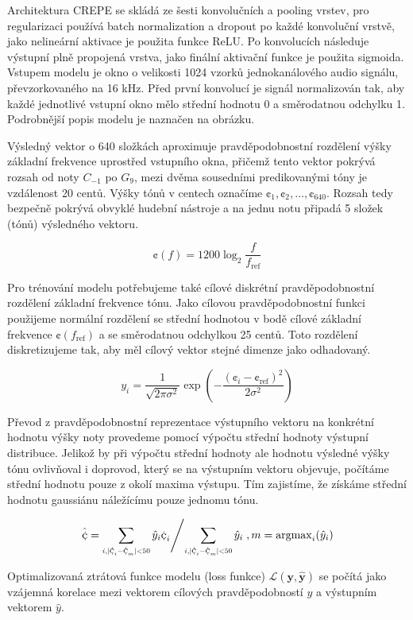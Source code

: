 Architektura CREPE se skládá ze šesti konvolučních a pooling vrstev, pro regularizaci používá batch normalization a dropout po každé konvoluční vrstvě, jako nelineární aktivace je použita funkce ReLU. Po konvolucích následuje výstupní plně propojená vrstva, jako finální aktivační funkce je použita sigmoida. Vstupem modelu je okno o velikosti 1024 vzorků jednokanálového audio signálu, převzorkovaného na 16 kHz. Před první konvolucí je signál normalizován tak, aby každé jednotlivé vstupní okno mělo střední hodnotu 0 a směrodatnou odchylku 1. Podrobnější popis modelu je naznačen na obrázku.

Výsledný vektor o 640 složkách aproximuje pravděpodobnostní rozdělení výšky základní frekvence uprostřed vstupního okna, přičemž tento vektor pokrývá rozsah od noty $C_{-1}$ po $G_{9}$, mezi dvěma sousedními predikovanými tóny je vzdálenost 20 centů. Výšky tónů v centech označíme $\cent_1, \cent_2, \dots, \cent_{640}$. Rozsah tedy bezpečně pokrývá obvyklé hudební nástroje a na jednu notu připadá 5 složek (tónů) výsledného vektoru.

    $$\cent(f) = 1200 \log_2{\frac{f}{f_{\mathrm{ref}}}}$$

Pro trénování modelu potřebujeme také cílové diskrétní pravděpodobnostní rozdělení základní frekvence tónu. Jako cílovou pravděpodobnostní funkci použijeme normální rozdělení se střední hodnotou v bodě cílové základní frekvence $\cent(f_{\mathrm{ref}})$ a se směrodatnou odchylkou 25 centů. Toto rozdělení diskretizujeme tak, aby měl cílový vektor stejné dimenze jako odhadovaný.

    $$y_i = \frac{1}{\sqrt{2 \pi \sigma^2}}\exp{(-\frac{(\cent_i - \cent_{\mathrm{ref}})^2}{2 \sigma^2})}$$

Převod z pravděpodobnostní reprezentace výstupního vektoru na konkrétní hodnotu výšky noty provedeme pomocí výpočtu střední hodnoty výstupní distribuce. Jelikož by při výpočtu střední hodnoty ale hodnotu výsledné výšky tónu ovlivňoval i doprovod, který se na výstupním vektoru objevuje, počítáme střední hodnotu pouze z okolí maxima výstupu. Tím zajistíme, že získáme střední hodnotu gaussiánu náležícímu pouze jednomu tónu.

    $$ \left. \hat{\cent} = \sum_{\scaleto{i, \lvert \cent_i - \cent_m \rvert < 50}{8pt}} {\hat{y}_i \cent_i} \middle/ \sum_{\scaleto{i, \lvert \cent_i - \cent_m \rvert < 50}{8pt}} \hat{y}_i \right., m = \mathrm{argmax}_i(\hat{y}_i)$$

Optimalizovaná ztrátová funkce modelu (loss funkce) $\mathcal{L}(\mathbf{y}, \mathbf{\hat{y}})$ se počítá jako vzájemná korelace mezi vektorem cílových pravděpodobností $y$ a výstupním vektorem $\hat{y}$.


